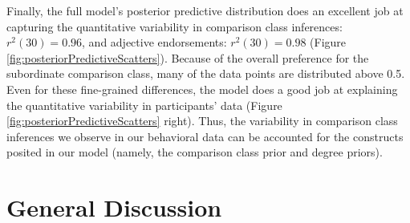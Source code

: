 \documentclass[doc]{apa6}
\begin{document}
Finally, the full model's posterior predictive distribution does an excellent job at capturing the quantitative variability in comparison class inferences: \(r^2(30) = 0.96\), and adjective endorsements: \(r^2(30) = 0.98\) (Figure \ref{fig:posteriorPredictiveScatters}). Because of the overall preference for the subordinate comparison class, many of the data points are distributed above 0.5. Even for these fine-grained differences, the model does a good job at explaining the quantitative variability in participants' data (Figure \ref{fig:posteriorPredictiveScatters} right). Thus, the variability in comparison class inferences we observe in our behavioral data can be accounted for the constructs posited in our model (namely, the comparison class prior and degree priors).

\section{General Discussion}



%
%
%
%
%
%
%
%
%
%








 


\end{document}
